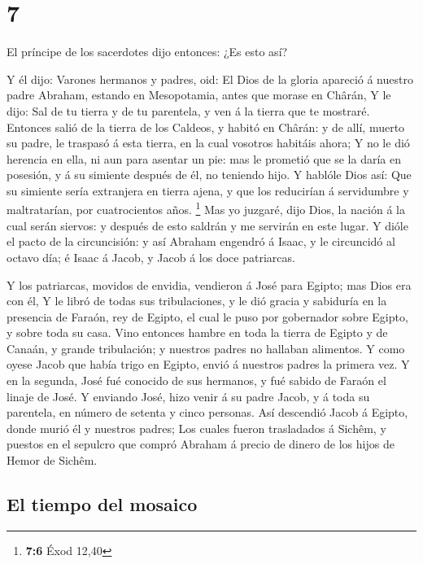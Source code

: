 \hypertarget{section-6}{%
\section{7}\label{section-6}}

 El príncipe de los sacerdotes dijo entonces: ¿Es esto
así?

 Y él dijo: Varones hermanos y padres, oid: El Dios de la
gloria apareció á nuestro padre Abraham, estando en Mesopotamia, antes
que morase en Chârán,  Y le dijo: Sal de tu tierra y de tu
parentela, y ven á la tierra que te mostraré.  Entonces
salió de la tierra de los Caldeos, y habitó en Chârán: y de allí, muerto
su padre, le traspasó á esta tierra, en la cual vosotros habitáis ahora;
 Y no le dió herencia en ella, ni aun para asentar un pie:
mas le prometió que se la daría en posesión, y á su simiente después de
él, no teniendo hijo.  Y hablóle Dios así: Que su simiente
sería extranjera en tierra ajena, y que los reducirían á servidumbre y
maltratarían, por cuatrocientos años. \footnote{\textbf{7:6} Éxod 12,40}
 Mas yo juzgaré, dijo Dios, la nación á la cual serán
siervos: y después de esto saldrán y me servirán en este lugar.
 Y dióle el pacto de la circuncisión: y así Abraham
engendró á Isaac, y le circuncidó al octavo día; é Isaac á Jacob, y
Jacob á los doce patriarcas.

 Y los patriarcas, movidos de envidia, vendieron á José
para Egipto; mas Dios era con él,  Y le libró de todas
sus tribulaciones, y le dió gracia y sabiduría en la presencia de
Faraón, rey de Egipto, el cual le puso por gobernador sobre Egipto, y
sobre toda su casa.  Vino entonces hambre en toda la
tierra de Egipto y de Canaán, y grande tribulación; y nuestros padres no
hallaban alimentos.  Y como oyese Jacob que había trigo
en Egipto, envió á nuestros padres la primera vez.  Y en
la segunda, José fué conocido de sus hermanos, y fué sabido de Faraón el
linaje de José.  Y enviando José, hizo venir á su padre
Jacob, y á toda su parentela, en número de setenta y cinco personas.
 Así descendió Jacob á Egipto, donde murió él y nuestros
padres;  Los cuales fueron trasladados á Sichêm, y
puestos en el sepulcro que compró Abraham á precio de dinero de los
hijos de Hemor de Sichêm.

\hypertarget{el-tiempo-del-mosaico}{%
\subsection{El tiempo del mosaico}\label{el-tiempo-del-mosaico}}

